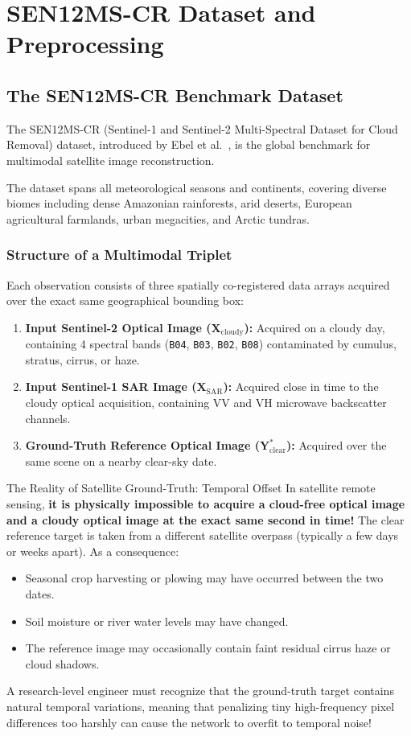 \chapter{SEN12MS-CR Dataset and Preprocessing}
\label{chap:ch07}

\section{The SEN12MS-CR Benchmark Dataset}
The SEN12MS-CR (Sentinel-1 and Sentinel-2 Multi-Spectral Dataset for Cloud Removal) dataset, introduced by Ebel et al.~\cite{ebel2020sen12mscr}, is the global benchmark for multimodal satellite image reconstruction.

The dataset spans all meteorological seasons and continents, covering diverse biomes including dense Amazonian rainforests, arid deserts, European agricultural farmlands, urban megacities, and Arctic tundras.

\subsection{Structure of a Multimodal Triplet}
Each observation consists of three spatially co-registered data arrays acquired over the exact same geographical bounding box:
\begin{enumerate}
    \item \textbf{Input Sentinel-2 Optical Image ($\mathbf{X}_{\text{cloudy}}$):} Acquired on a cloudy day, containing 4 spectral bands (\texttt{B04}, \texttt{B03}, \texttt{B02}, \texttt{B08}) contaminated by cumulus, stratus, cirrus, or haze.
    \item \textbf{Input Sentinel-1 SAR Image ($\mathbf{X}_{\text{SAR}}$):} Acquired close in time to the cloudy optical acquisition, containing VV and VH microwave backscatter channels.
    \item \textbf{Ground-Truth Reference Optical Image ($\mathbf{Y}^*_{\text{clear}}$):} Acquired over the same scene on a nearby clear-sky date.
\end{enumerate}

\begin{warningbox}{The Reality of Satellite Ground-Truth: Temporal Offset}
In satellite remote sensing, \textbf{it is physically impossible to acquire a cloud-free optical image and a cloudy optical image at the exact same second in time!} 
The clear reference target is taken from a different satellite overpass (typically a few days or weeks apart). As a consequence:
\begin{itemize}
    \item Seasonal crop harvesting or plowing may have occurred between the two dates.
    \item Soil moisture or river water levels may have changed.
    \item The reference image may occasionally contain faint residual cirrus haze or cloud shadows.
\end{itemize}
A research-level engineer must recognize that the ground-truth target contains natural temporal variations, meaning that penalizing tiny high-frequency pixel differences too harshly can cause the network to overfit to temporal noise!
\end{warningbox}

